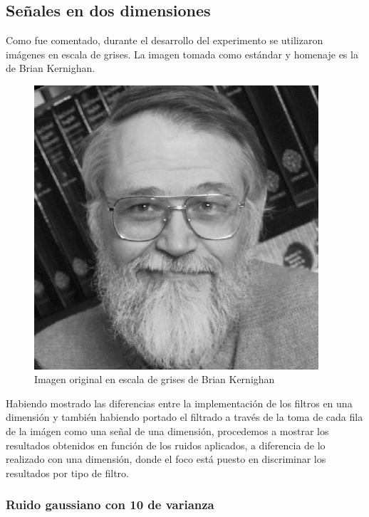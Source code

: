 \newpage

        \subsection{Se\~nales en dos dimensiones}

Como fue comentado, durante el desarrollo del experimento se utilizaron
im\'agenes en escala de grises. La imagen tomada como est\'andar y homenaje es 
la de Brian Kernighan.

\begin{figure}[H]
\begin {center}
\includegraphics[width=299pt]{imagenes/brian_kernighan.png}
\end {center}
\caption{Imagen original en escala de grises de Brian Kernighan}
\label{fig:SinProm}
\end{figure}

Habiendo mostrado las diferencias entre la implementaci\'on de los filtros en
una dimensi\'on y tambi\'en habiendo portado el filtrado a trav\'es de la toma de cada
fila de la im\'agen como una se\~nal de una dimensi\'on, procedemos a mostrar
los resultados obtenidos en funci\'on de los ruidos aplicados, a diferencia de
lo realizado con una dimensi\'on, donde el foco est\'a puesto en discriminar los
resultados por tipo de filtro.

\subsubsection{Ruido gaussiano con 10 de varianza}

